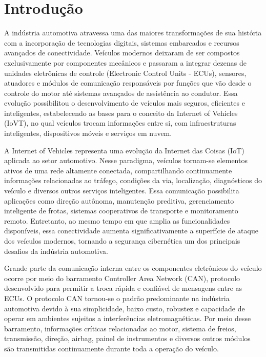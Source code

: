 \chapter{Introdução}

A indústria automotiva atravessa uma das maiores transformações de sua história com a incorporação de tecnologias digitais, sistemas embarcados e recursos avançados de conectividade. Veículos modernos deixaram de ser compostos exclusivamente por componentes mecânicos e passaram a integrar dezenas de unidades eletrônicas de controle (Electronic Control Units - ECUs), sensores, atuadores e módulos de comunicação responsáveis por funções que vão desde o controle do motor até sistemas avançados de assistência ao condutor. Essa evolução possibilitou o desenvolvimento de veículos mais seguros, eficientes e inteligentes, estabelecendo as bases para o conceito da Internet of Vehicles (IoVT), no qual veículos trocam informações entre si, com infraestruturas inteligentes, dispositivos móveis e serviços em nuvem.

A Internet of Vehicles representa uma evolução da Internet das Coisas (IoT) aplicada ao setor automotivo. Nesse paradigma, veículos tornam-se elementos ativos de uma rede altamente conectada, compartilhando continuamente informações relacionadas ao tráfego, condições da via, localização, diagnósticos do veículo e diversos outros serviços inteligentes. Essa comunicação possibilita aplicações como direção autônoma, manutenção preditiva, gerenciamento inteligente de frotas, sistemas cooperativos de transporte e monitoramento remoto. Entretanto, ao mesmo tempo em que amplia as funcionalidades disponíveis, essa conectividade aumenta significativamente a superfície de ataque dos veículos modernos, tornando a segurança cibernética um dos principais desafios da indústria automotiva.

Grande parte da comunicação interna entre os componentes eletrônicos do veículo ocorre por meio do barramento Controller Area Network (CAN), protocolo desenvolvido para permitir a troca rápida e confiável de mensagens entre as ECUs. O protocolo CAN tornou-se o padrão predominante na indústria automotiva devido à sua simplicidade, baixo custo, robustez e capacidade de operar em ambientes sujeitos a interferências eletromagnéticas. Por meio desse barramento, informações críticas relacionadas ao motor, sistema de freios, transmissão, direção, airbag, painel de instrumentos e diversos outros módulos são transmitidas continuamente durante toda a operação do veículo.

